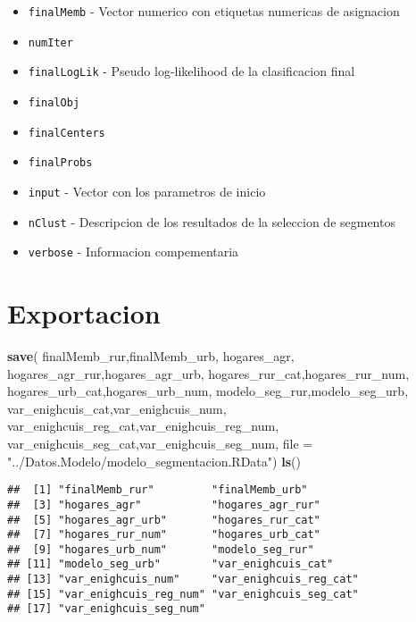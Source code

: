 \documentclass[11pt,]{article}
\newenvironment{Shaded}{\begin{snugshade}}{\end{snugshade}}
\newcommand{\KeywordTok}[1]{\textcolor[rgb]{0.13,0.29,0.53}{\textbf{#1}}}
\newcommand{\DataTypeTok}[1]{\textcolor[rgb]{0.13,0.29,0.53}{#1}}
\newcommand{\StringTok}[1]{\textcolor[rgb]{0.31,0.60,0.02}{#1}}
\newcommand{\NormalTok}[1]{#1}
\begin{document}
\begin{itemize}
\item
  \texttt{finalMemb} - Vector numerico con etiquetas numericas de
  asignacion
\item
  \texttt{numIter}
\item
  \texttt{finalLogLik} - Pseudo log-likelihood de la clasificacion final
\item
  \texttt{finalObj}
\item
  \texttt{finalCenters}
\item
  \texttt{finalProbs}
\item
  \texttt{input} - Vector con los parametros de inicio
\item
  \texttt{nClust} - Descripcion de los resultados de la seleccion de
  segmentos
\item
  \texttt{verbose} - Informacion compementaria
\end{itemize}

\section{Exportacion}\label{exportacion}

\begin{Shaded}
\begin{Highlighting}[]
\KeywordTok{save}\NormalTok{( finalMemb_rur,finalMemb_urb,}
\NormalTok{      hogares_agr,}
\NormalTok{      hogares_agr_rur,hogares_agr_urb,}
\NormalTok{      hogares_rur_cat,hogares_rur_num,}
\NormalTok{      hogares_urb_cat,hogares_urb_num,}
\NormalTok{      modelo_seg_rur,modelo_seg_urb,}
\NormalTok{      var_enighcuis_cat,var_enighcuis_num,}
\NormalTok{      var_enighcuis_reg_cat,var_enighcuis_reg_num,}
\NormalTok{      var_enighcuis_seg_cat,var_enighcuis_seg_num,}
     \DataTypeTok{file =} \StringTok{"../Datos.Modelo/modelo_segmentacion.RData"}\NormalTok{)}
\KeywordTok{ls}\NormalTok{()}
\end{Highlighting}
\end{Shaded}

\begin{verbatim}
##  [1] "finalMemb_rur"         "finalMemb_urb"        
##  [3] "hogares_agr"           "hogares_agr_rur"      
##  [5] "hogares_agr_urb"       "hogares_rur_cat"      
##  [7] "hogares_rur_num"       "hogares_urb_cat"      
##  [9] "hogares_urb_num"       "modelo_seg_rur"       
## [11] "modelo_seg_urb"        "var_enighcuis_cat"    
## [13] "var_enighcuis_num"     "var_enighcuis_reg_cat"
## [15] "var_enighcuis_reg_num" "var_enighcuis_seg_cat"
## [17] "var_enighcuis_seg_num"
\end{verbatim}
\end{document}
